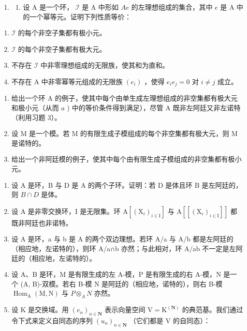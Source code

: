 \begin{enumerate}
\def\labelenumi{\arabic{enumi})}
\setcounter{enumi}{6}
\tightlist
\item
  \begin{enumerate}
  \def\labelenumii{\alph{enumii})}
  \tightlist
  \item
    设 A 是一个环， \(\mathcal{I}\) 是 A 中形如 \(Ae\) 的左理想组成的集合，其中 \(e\) 是 A 中的一个幂等元。证明下列性质等价：
  \end{enumerate}
\end{enumerate}

\begin{enumerate}
\def\labelenumi{(\roman{enumi})}
\item
  \(\mathcal{I}\) 的每个非空子集都有极小元。
\item
  \(\mathcal{I}\) 的每个非空子集都有极大元。
\item
  不存在 \(\mathcal{I}\) 中非零理想组成的无限族，使其和为直和。
\item
  不存在 A 中非零幂等元组成的无限族 \((e_i)\) ，使得 \(e_i e_j = 0\) 对 \(i \neq j\) 成立。
\end{enumerate}

\begin{enumerate}
\def\labelenumi{\alph{enumi})}
\setcounter{enumi}{1}
\item
  给出一个环 A 的例子，使其中每个由单生成左理想组成的非空集都有极大元和极小元（从而 \(a\) ) 中的等价条件得到满足），尽管 A 既非左阿廷又非左诺特（利用习题 3）。
\item
  设 M 是一个模。若 M 的有限生成子模组成的每个非空集都有极大元，则 M 是诺特的。
\item
  给出一个非阿廷模的例子，使其中每个由有限生成子模组成的非空集都有极小元。
\end{enumerate}

\begin{enumerate}
\def\labelenumi{\arabic{enumi})}
\setcounter{enumi}{7}
\item
  设 A 是环，B 与 D 是 A 的两个子环。证明：若 D 是体且环 B 是左阿廷的，则 \(B \cap D\) 是体。
\item
  设 A 是非零交换环，I 是无限集。环 \(\mathrm{A}[(\mathrm{X}_{i})_{i\in\mathrm{I}}]\) 与 \(\mathrm{A}[[(\mathrm{X}_{i})_{i\in\mathrm{I}}]]\) 都既非阿廷也非诺特。
\item
  设 A 是环，a 与 b 是 A 的两个双边理想。若环 A/a 与 A/b 都是左阿廷的（相应地，左诺特的），则环 A/a∩b 亦然；与此相对，环 A/ab 不一定是左阿廷的（相应地，左诺特的）。
\item
  设 A、B 是环，M 是有限生成的左 A-模，P 是有限生成的右 A-模，N 是一个 (A, B)-双模。若右 B-模 N 是阿廷的（相应地，诺特的），则右 B-模 \(\operatorname{Hom}_{\mathrm{A}}(\mathrm{M}, \mathrm{N})\) 与 \(P \otimes_{A} N\) 亦然。
\item
  设 \(\mathrm{K}\) 是交换域。用 \((e_n)_{n\in \mathbf{N}}\) 表示向量空间 \(\mathrm{V} = \mathrm{K}^{(\mathbf{N})}\) 的典范基。我们通过令下式来定义自同态的序列 \((u_n)_{n\in \mathbf{N}}\) （它们都是 \(\mathrm{V}\) 的自同态）：
\end{enumerate}

